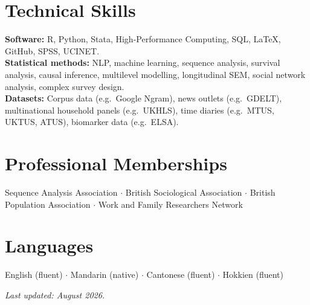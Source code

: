 \documentclass[11pt,a4paper]{article}
\begin{document}
\section*{Technical Skills}
\textbf{Software:} R, Python, Stata, High-Performance Computing, SQL, \LaTeX, GitHub, SPSS, UCINET.\\[2pt]
\textbf{Statistical methods:} NLP, machine learning, sequence analysis, survival analysis, causal inference, multilevel modelling, longitudinal SEM, social network analysis, complex survey design.\\[2pt]
\textbf{Datasets:} Corpus data (e.g.\ Google Ngram), news outlets (e.g.\ GDELT), multinational household panels (e.g.\ UKHLS), time diaries (e.g.\ MTUS, UKTUS, ATUS), biomarker data (e.g.\ ELSA).

\section*{Professional Memberships}
Sequence Analysis Association $\cdot$ British Sociological Association $\cdot$ British Population Association $\cdot$ Work and Family Researchers Network

\section*{Languages}
English (fluent) $\cdot$ Mandarin (native) $\cdot$ Cantonese (fluent) $\cdot$ Hokkien (fluent)

\vspace{8pt}
\begin{center}\footnotesize
\textit{Last updated: August 2026.}
\end{center}
\end{document}
